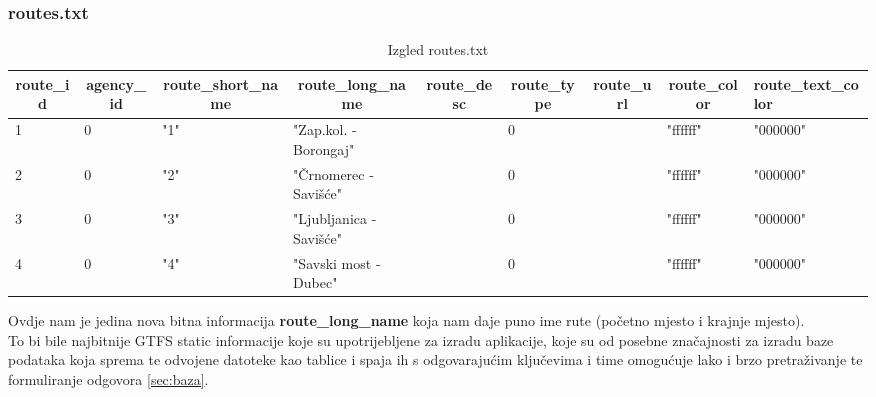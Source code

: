 \documentclass[zavrsnirad]{fer}
\begin{document}
\subsubsection{routes.txt}

\begin{table}[htb]
	\begin{adjustbox}{width=\columnwidth,center}
	\begin{tabular}{l|l|l|l|l|l|l|l|l}
		\hline
		\multicolumn{1}{c|}{\textbf{route\_id}} & \multicolumn{1}{c|}{\textbf{agency\_id}} & \multicolumn{1}{c|}{\textbf{route\_short\_name}} & \multicolumn{1}{c|}{\textbf{route\_long\_name}} & \multicolumn{1}{c|}{\textbf{route\_desc}} & \multicolumn{1}{c|}{\textbf{route\_type}} & \multicolumn{1}{c|}{\textbf{route\_url}} & \multicolumn{1}{c|}{\textbf{route\_color}} & \textbf{route\_text\_color} \\ \hline
		1 & 0 & "1" & "Zap.kol. - Borongaj" &  & 0 &  & "ffffff" & "000000" \\ \hline
		2 & 0 & "2" & "Črnomerec - Savišće" &  & 0 &  & "ffffff" & "000000" \\ \hline
		3 & 0 & "3" & "Ljubljanica -Savišće" &  & 0 &  & "ffffff" & "000000" \\ \hline
		4 & 0 & "4" & "Savski most - Dubec" &  & 0 &  & "ffffff" & "000000" \\ \hline
	\end{tabular}
	\end{adjustbox}
	\caption{Izgled routes.txt}
	\label{tbl:routes}
\end{table}

Ovdje nam je jedina nova bitna informacija \textbf{route\_long\_name} koja nam daje puno ime rute (početno mjesto i krajnje mjesto).\\

To bi bile najbitnije GTFS static informacije koje su upotrijebljene za izradu aplikacije, koje su od posebne značajnosti za izradu baze podataka koja sprema te odvojene datoteke kao tablice i spaja ih s odgovarajućim ključevima i time omogućuje lako i brzo pretraživanje te formuliranje odgovora \ref{sec:baza}.

\newpage
\end{document}
